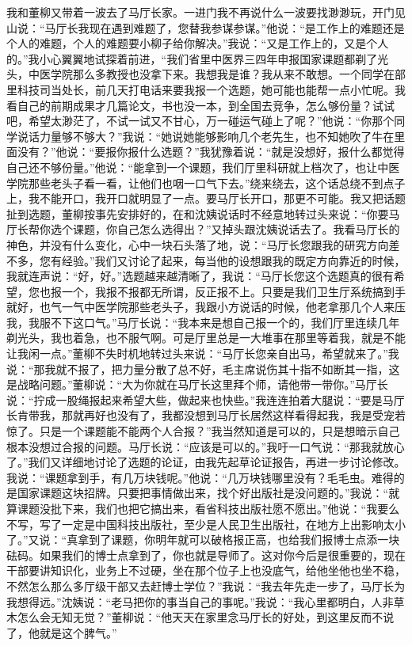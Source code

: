 \documentclass[12pt,oneside]{book}
\begin{document}
我和董柳又带着一波去了马厅长家。一进门我不再说什么一波要找渺渺玩，开门见山说：``马厅长我现在遇到难题了，您替我参谋参谋。''他说：``是工作上的难题还是个人的难题，个人的难题要小柳子给你解决。''我说：``又是工作上的，又是个人的。''我小心翼翼地试探着前进，``我们省里中医界三四年申报国家课题都剃了光头，中医学院那么多教授也没拿下来。我想我是谁？我从来不敢想。一个同学在部里科技司当处长，前几天打电话来要我报一个选题，她可能也能帮一点小忙呢。我看自己的前期成果才几篇论文，书也没一本，到全国去竞争，怎么够份量？试试吧，希望太渺茫了，不试一试又不甘心，万一碰运气碰上了呢？''他说：``你那个同学说话力量够不够大？''我说：``她说她能够影响几个老先生，也不知她吹了牛在里面没有？''他说：``要报你报什么选题？''我犹豫着说：``就是没想好，报什么都觉得自己还不够份量。''他说：``能拿到一个课题，我们厅里科研就上档次了，也让中医学院那些老头子看一看，让他们也咽一口气下去。''绕来绕去，这个话总绕不到点子上，我不能开口，我开口就明显了一点。要马厅长开口，那更不可能。我又把话题扯到选题，董柳按事先安排好的，在和沈姨说话时不经意地转过头来说：``你要马厅长帮你选个课题，你自己怎么选得出？''又掉头跟沈姨说话去了。我看马厅长的神色，并没有什么变化，心中一块石头落了地，说：``马厅长您跟我的研究方向差不多，您有经验。''我们又讨论了起来，每当他的设想跟我的既定方向靠近的时候，我就连声说：``好，好。''选题越来越清晰了，我说：``马厅长您这个选题真的很有希望，您也报一个，我报不报都无所谓，反正报不上。只要是我们卫生厅系统搞到手就好，也气一气中医学院那些老头子，我跟小方说话的时候，他老拿那几个人来压我，我服不下这口气。''马厅长说：``我本来是想自己报一个的，我们厅里连续几年剃光头，我也着急，也不服气啊。可是厅里总是一大堆事在那里等着我，就是不能让我闲一点。''董柳不失时机地转过头来说：``马厅长您亲自出马，希望就来了。''我说：``那我就不报了，把力量分散了总不好，毛主席说伤其十指不如断其一指，这是战略问题。''董柳说：``大为你就在马厅长这里拜个师，请他带一带你。''马厅长说：``拧成一股绳报起来希望大些，做起来也快些。''我连连拍着大腿说：``要是马厅长肯带我，那就再好也没有了，我都没想到马厅长居然这样看得起我，我是受宠若惊了。只是一个课题能不能两个人合报？''我当然知道是可以的，只是想暗示自己根本没想过合报的问题。马厅长说：``应该是可以的。''我吁一口气说：``那我就放心了。''我们又详细地讨论了选题的论证，由我先起草论证报告，再进一步讨论修改。我说：``课题拿到手，有几万块钱呢。''他说：``几万块钱哪里没有？毛毛虫。难得的是国家课题这块招牌。只要把事情做出来，找个好出版社是没问题的。''我说：``就算课题没批下来，我们也把它搞出来，看省科技出版社愿不愿出。''他说：``我要么不写，写了一定是中国科技出版社，至少是人民卫生出版社，在地方上出影响太小了。''又说：``真拿到了课题，你明年就可以破格报正高，也给我们报博士点添一块砝码。如果我们的博士点拿到了，你也就是导师了。这对你今后是很重要的，现在干部要讲知识化，业务上不过硬，坐在那个位子上也没底气，给他坐他也坐不稳，不然怎么那么多厅级干部又去赶博士学位？''我说：``我去年先走一步了，马厅长为我想得远。''沈姨说：``老马把你的事当自己的事呢。''我说：``我心里都明白，人非草木怎么会无知无觉？''董柳说：``他天天在家里念马厅长的好处，到这里反而不说了，他就是这个脾气。''
\end{document}
